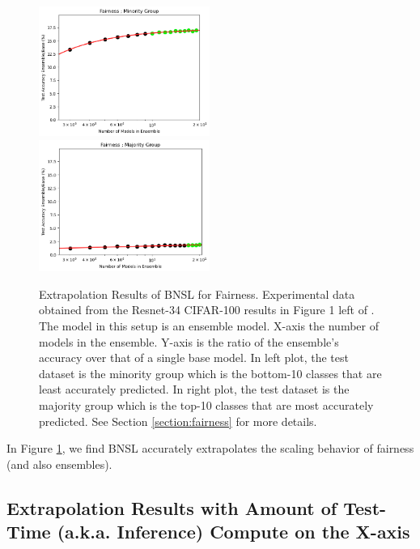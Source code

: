 \documentclass{article} %
\begin{document}
\begin{figure}[htbp]
    \centering
\includegraphics[width=0.497\textwidth]{figures/fairness/minority.png}
\includegraphics[width=0.497\textwidth]{figures/fairness/majority.png}
    \caption{
Extrapolation Results of BNSL for Fairness. Experimental data obtained from the Resnet-34 CIFAR-100 results in Figure 1 left of \cite{ko2023fair}. The model in this setup is an ensemble model. X-axis the number of models in the ensemble. Y-axis is the ratio of the ensemble's accuracy over that of a single base model. In left plot, the test dataset is the minority group which is the bottom-10 classes that are least accurately predicted. In right plot, the test dataset is the majority group which is the top-10 classes that are most accurately predicted. See Section \ref{section:fairness} for more details.
    }
    \label{fig:fairness}
\end{figure}

In Figure \ref{fig:fairness}, we find BNSL accurately extrapolates the scaling behavior of fairness (and also ensembles).

\clearpage

\subsection{Extrapolation Results with Amount of Test-Time (a.k.a. Inference) Compute on the X-axis}
\label{section:test-time_compute}
\end{document}
